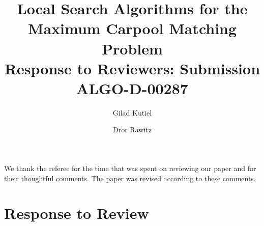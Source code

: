 \documentclass[11pt]{article}
\begin{document}
\title{\textbf{Local Search Algorithms for the \\ Maximum Carpool Matching
  Problem} \\
  {\Large Response to Reviewers: Submission ALGO-D-00287}}

\author{Gilad Kutiel \and Dror Rawitz}

\maketitle


We thank the referee for the time that was spent on reviewing our
paper and for their thoughtful comments.  The paper was revised
according to these comments.


\medskip

\section*{Response to Review}
\end{document}
